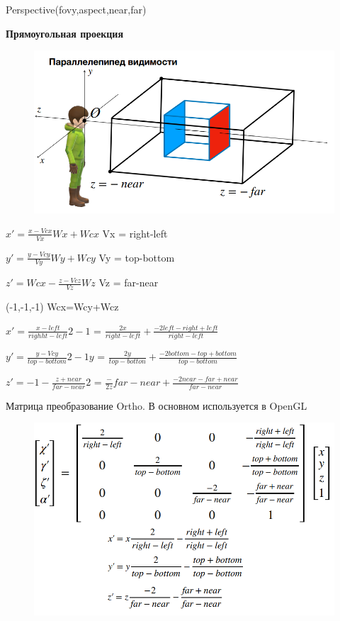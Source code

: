 \documentclass{article}
\begin{document}
Perspective(fovy,aspect,near,far)

\vspace{5cm}

\textbf{Прямоугольная проекция}


\begin{figure} [H]
    \includegraphics[width=0.70\linewidth]{Снимок экрана 2025-04-14 125703.png}
\end{figure}


$x'=\frac{x-Vcx}{Vx}Wx+Wcx$ \vspace{1cm} Vx = right-left

$y'=\frac{y-Vcy}{Vy}Wy+Wcy$ \vspace{1cm} Vy = top-bottom

$z'= Wcx- \frac{z-Vcz}{Vz}Wz$   \vspace{1cm} Vz = far-near

(-1,-1,-1)
\vspace{1mm}
Wcx=Wcy+Wcz
\vspace{1mm}

$x'=\frac{x-left}{righht-left}2-1$ \vspace{1cm} = $\frac{2x}{right-left}+\frac{-2left-right+left}{right-left}$

$y'=\frac{y-Vcy}{top-bottom}2-1y$ \vspace{1cm} = $\frac{2y}{top-botton}+\frac{-2bottom-top+bottom}{top-bottom}$

$z'= -1 - \frac{z+near}{far-near}2$   \vspace{1cm} = $\frac-{2z}{far-near}+\frac{-2near-far+near}{far-near}$


\vspace{5cm}
Матрица преобразование Ortho. В основном используется в OpenGL

\begin{figure} [H]
    \includegraphics[width=0.70\linewidth]{Снимок экрана 2025-04-14 131345.png}
\end{figure}
\end{document}
